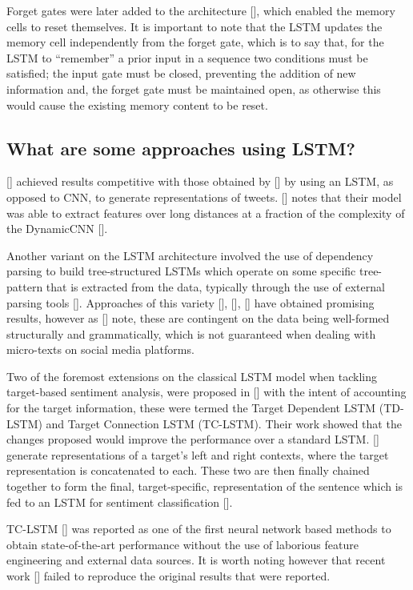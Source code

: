 \documentclass[12pt, a4paper]{report}
\theoremstyle{definition}
\theoremstyle{definition}%
\theoremstyle{definition}%
\theoremstyle{definition}%
\theoremstyle{definition}%
\theoremstyle{definition}%
\renewcommand{\cite}[1]{[\citealp{#1}]}
\begin{document}
Forget gates were later added to the architecture \cite{gers2000}, which enabled the memory cells to reset themselves. It is important to note that the LSTM updates the memory cell independently from the forget gate, which is to say that, for the LSTM to \enquote{remember} a prior input in a sequence two conditions must be satisfied; the input gate must be closed, preventing the addition of new information and, the forget gate must be maintained open, as otherwise this would cause the existing memory content to be reset.

\subsection{What are some approaches using LSTM?}
\cite{wang} achieved results competitive with those obtained by \cite{kalchbrenner2014} by using an LSTM, as opposed to CNN, to generate representations of tweets. \cite{young2017} notes that their model was able to extract features over long distances at a fraction of the complexity of the DynamicCNN \cite{kalchbrenner2014}.

Another variant on the LSTM architecture involved the use of dependency parsing to build tree-structured LSTMs which operate on some specific tree-pattern that is extracted from the data, typically through the use of external parsing tools \cite{socher2013}. Approaches of this variety \cite{jiweili2015}, \cite{kaishengtai2015}, \cite{zhu2015} have obtained promising results, however as \cite{chen2017} note, these are contingent on the data being well-formed structurally and grammatically, which is not guaranteed when dealing with micro-texts on social media platforms.

Two of the foremost extensions on the classical LSTM model when tackling target-based sentiment analysis, were proposed in \cite{tang2016b} with the intent of accounting for the target information, these were termed the Target Dependent LSTM (TD-LSTM) and Target Connection LSTM (TC-LSTM). Their work showed that the changes proposed would improve the performance over a standard LSTM. \cite{tang2016b} generate representations of a target's left and right contexts, where the target representation is concatenated to each. These two are then finally chained together to form the final, target-specific, representation of the sentence which is fed to an LSTM for sentiment classification \cite{dehongma2017}.

TC-LSTM \cite{tang2016b} was reported as one of the first neural network based methods to obtain state-of-the-art performance without the use of laborious feature engineering and external data sources. It is worth noting however that recent work \cite{moore2018} failed to reproduce the original results that were reported.
\end{document}
